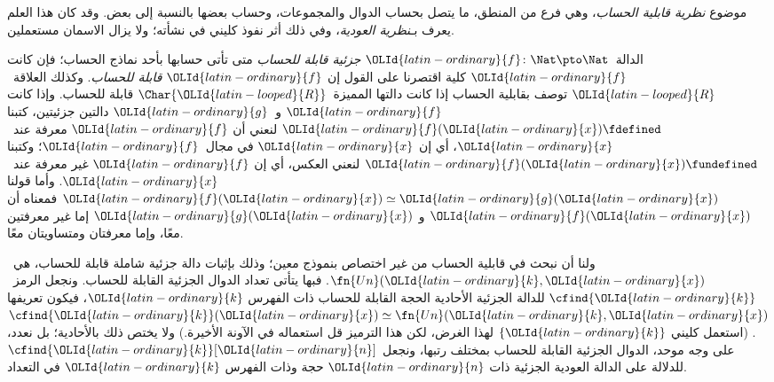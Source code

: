 \documentclass[../../../include/open-logic-section]{subfiles}
\begin{document}

موضوع \emph{نظرية قابلية الحساب}، وهي فرع من المنطق، ما يتصل
بحساب الدوال والمجموعات، وحساب بعضها بالنسبة إلى بعض. وقد كان
هذا العلم يعرف بـ\emph{نظرية العودية}، وفي ذلك أثر نفوذ كليني في نشأته؛
ولا يزال الاسمان مستعملين.

الدالة~$\OLId{latin-ordinary}{f}\colon\Nat\pto\Nat$ \emph{جزئية قابلة للحساب} متى تأتى
حسابها بأحد نماذج الحساب؛ فإن كانت $\OLId{latin-ordinary}{f}$ كلية اقتصرنا على القول إن
$\OLId{latin-ordinary}{f}$ \emph{قابلة للحساب}. وكذلك العلاقة~$\OLId{latin-looped}{R}$ توصف بقابلية الحساب إذا كانت دالتها
المميزة~$\Char{\OLId{latin-looped}{R}}$ قابلة للحساب. وإذا كانت $\OLId{latin-ordinary}{f}$ و~$\OLId{latin-ordinary}{g}$ دالتين
جزئيتين، كتبنا $\OLId{latin-ordinary}{f}(\OLId{latin-ordinary}{x})\fdefined$ لنعني أن $\OLId{latin-ordinary}{f}$ معرفة عند~$\OLId{latin-ordinary}{x}$، أي إن
$\OLId{latin-ordinary}{x}$ في مجال~$\OLId{latin-ordinary}{f}$؛ وكتبنا $\OLId{latin-ordinary}{f}(\OLId{latin-ordinary}{x})\fundefined$ لنعني العكس، أي إن $\OLId{latin-ordinary}{f}$
غير معرفة عند~$\OLId{latin-ordinary}{x}$. وأما قولنا $\OLId{latin-ordinary}{f}(\OLId{latin-ordinary}{x})\simeq \OLId{latin-ordinary}{g}(\OLId{latin-ordinary}{x})$ فمعناه أن $\OLId{latin-ordinary}{f}(\OLId{latin-ordinary}{x})$ و
$\OLId{latin-ordinary}{g}(\OLId{latin-ordinary}{x})$ إما غير معرفتين معًا، وإما معرفتان ومتساويتان معًا.

ولنا أن نبحث في قابلية الحساب من غير اختصاص بنموذج
معين؛ وذلك بإثبات دالة جزئية شاملة قابلة للحساب،
هي~$\fn{Un}(\OLId{latin-ordinary}{k},\OLId{latin-ordinary}{x})$. فبها يتأتى تعداد الدوال الجزئية القابلة للحساب.
ونجعل الرمز~$\cfind{\OLId{latin-ordinary}{k}}$ للدالة الجزئية الأحادية الحجة
القابلة للحساب ذات الفهرس $\OLId{latin-ordinary}{k}$، فيكون تعريفها
$\cfind{\OLId{latin-ordinary}{k}}(\OLId{latin-ordinary}{x})\simeq\fn{Un}(\OLId{latin-ordinary}{k},\OLId{latin-ordinary}{x})$. (استعمل كليني $\{\OLId{latin-ordinary}{k}\}$ لهذا الغرض،
لكن هذا الترميز قل استعماله في الآونة الأخيرة.) ولا يختص ذلك بالأحادية؛
بل نعدد، على وجه موحد، الدوال الجزئية القابلة للحساب بمختلف
رتبها، ونجعل $\cfind{\OLId{latin-ordinary}{k}}[\OLId{latin-ordinary}{n}]$ للدلالة على الدالة العودية الجزئية
ذات $\OLId{latin-ordinary}{n}$ حجة وذات الفهرس $\OLId{latin-ordinary}{k}$ في التعداد.
\end{document}
